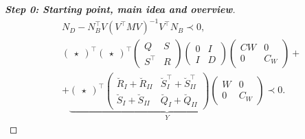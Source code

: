 \documentclass[11pt,a4paper,oneside,DIV=12,headings=small]{scrartcl}
\theoremstyle{plain}
\begin{document}
\begin{proof}[\textbf{Step 0: \emph{Starting point, main idea and overview}}]
\begin{subequations}
\begin{align}
&N_D-N_B^\top V (V^\top M V)^{-1} V^\top N_B  \prec 0, \label{DisCompactA}  \\
&\begin{pmatrix} \star\end{pmatrix}^\top
\begin{pmatrix} \star\end{pmatrix}^\top
\begin{pmatrix} Q &  S \\ S^\top & R \end{pmatrix}
\begin{pmatrix} 0 & I \\ I & D \end{pmatrix}
\begin{pmatrix} CW & 0 \\ 0 & C_W \end{pmatrix} + \nonumber \\
&+\underbrace{
\begin{pmatrix} \star \end{pmatrix}^\top
\begin{pmatrix} \breve{R}_I+\breve{R}_{II} &  \breve{S}_I^\top+\breve{S}_{II}^\top \\ \breve{S}_I+\breve{S}_{II} & \breve{Q}_I+\breve{Q}_{II} \end{pmatrix}
\begin{pmatrix} W & 0 \\ 0 & C_W \end{pmatrix}}_Y\prec 0. \label{DisCompactB}
\end{align}
\end{subequations}


\end{proof}
\end{document}
